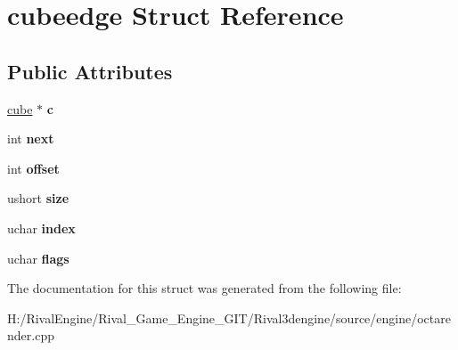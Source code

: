 \hypertarget{structcubeedge}{}\section{cubeedge Struct Reference}
\label{structcubeedge}
\subsection*{Public Attributes}
\begin{DoxyCompactItemize}
\item 
\mbox{\label{structcubeedge_ac43ae7f8950a49f658c33120e053af81}} 
\hyperlink{structcube}{cube} $\ast$ {\bfseries c}
\item 
\mbox{\label{structcubeedge_a5efd0446276720a6d155bfff33d1f9bd}} 
int {\bfseries next}
\item 
\mbox{\label{structcubeedge_a61b6c1edc1c08ccda653d5edad344c2b}} 
int {\bfseries offset}
\item 
\mbox{\label{structcubeedge_ac9d6ca98e013cfe7c15a283d621cae1c}} 
ushort {\bfseries size}
\item 
\mbox{\label{structcubeedge_abcf8b1a174f390ef9f47b3ecfa2b440e}} 
uchar {\bfseries index}
\item 
\mbox{\label{structcubeedge_a95d7f0b418b776ce6c30741443d76585}} 
uchar {\bfseries flags}
\end{DoxyCompactItemize}


The documentation for this struct was generated from the following file\+:\begin{DoxyCompactItemize}
\item 
H\+:/\+Rival\+Engine/\+Rival\+\_\+\+Game\+\_\+\+Engine\+\_\+\+G\+I\+T/\+Rival3dengine/source/engine/octarender.\+cpp\end{DoxyCompactItemize}
